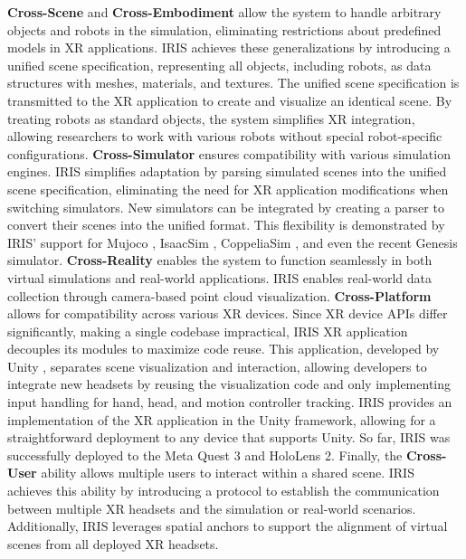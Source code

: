 \textbf{Cross-Scene} and \textbf{Cross-Embodiment} allow the system to handle arbitrary objects and robots in the simulation,
eliminating restrictions about predefined models in XR applications.
IRIS achieves these generalizations by introducing a unified scene specification, representing all objects,
including robots, as data structures with meshes, materials, and textures.
The unified scene specification is transmitted to the XR application to create and visualize an identical scene.
By treating robots as standard objects, the system simplifies XR integration,
allowing researchers to work with various robots without special robot-specific configurations.
\textbf{Cross-Simulator} ensures compatibility with various simulation engines.
IRIS simplifies adaptation by parsing simulated scenes into the unified scene specification, eliminating the need for XR application modifications when switching simulators.
New simulators can be integrated by creating a parser to convert their scenes into the unified format.
This flexibility is demonstrated by IRIS’ support for Mujoco \cite{todorov2012mujoco}, IsaacSim \cite{mittal2023orbit}, CoppeliaSim \cite{coppeliaSim}, and even the recent Genesis \cite{Genesis} simulator.
\textbf{Cross-Reality} enables the system to function seamlessly in both virtual simulations and real-world applications.
IRIS enables real-world data collection through camera-based point cloud visualization.
\textbf{Cross-Platform} allows for compatibility across various XR devices.
Since XR device APIs differ significantly, making a single codebase impractical, IRIS XR application decouples its modules to maximize code reuse.
This application, developed by Unity \cite{unity3dUnityManual}, separates scene visualization and interaction, allowing developers to integrate new headsets by reusing the visualization code and only implementing input handling for hand, head, and motion controller tracking.
IRIS provides an implementation of the XR application in the Unity framework, allowing for a straightforward deployment to any device that supports Unity. 
So far, IRIS was successfully deployed to the Meta Quest 3 and HoloLens 2.
Finally, the \textbf{Cross-User} ability allows multiple users to interact within a shared scene.
IRIS achieves this ability by introducing a protocol to establish the communication between multiple XR headsets and the simulation or real-world scenarios.
Additionally, IRIS leverages spatial anchors to support the alignment of virtual scenes from all deployed XR headsets.
